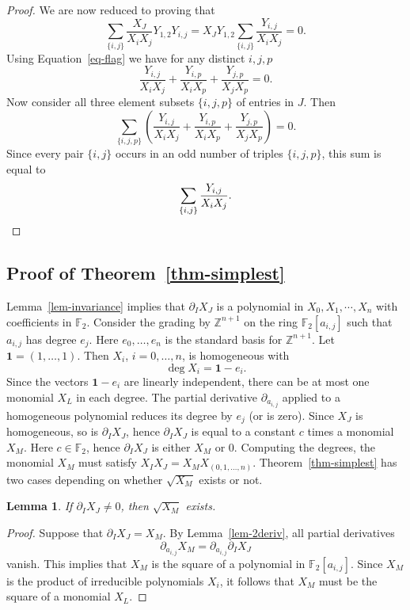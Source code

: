 \documentclass[10pt]{article}
\newtheorem{lemma}[theorem]{Lemma}
\theoremstyle{definition}
\newcommand{\FF}{{\mathbb{F}}}
\newcommand{\ZZ}{{\mathbb{Z}}}
\newcommand{\one}{{\mathbf{1}}}
\renewcommand{\a}[1]{a_{#1}}
\begin{document}
\begin{proof}
 We are now reduced to proving that 
 \[  \sum_{\{i,j\}} \frac{X_J}{X_{i}X_{j}} Y_{1,2} Y_{i,j} = X_J Y_{1,2} \sum_{\{i,j\}} \frac{Y_{i,j}}{X_{i}X_{j}}  = 0.\]
Using Equation~\eqref{eq-flag} we have for any distinct $i,j, p$
\[ \frac{Y_{i,j}}{X_{i}X_{j}} + \frac{Y_{i,p}}{X_{i}X_{p}} +\frac{Y_{j,p}}{X_{j}X_{p}} = 0.\]
Now consider all three element subsets $\{i,j,p\}$ of entries in $J$. Then 
\[ \sum_{\{i,j,p\}} \left( \frac{Y_{i,j}}{X_{i}X_{j}} + \frac{Y_{i,p}}{X_{i}X_{p}} +\frac{Y_{j,p}}{X_{j}X_{p}} \right) = 0.\]
Since every pair $\{i,j\}$ occurs in an odd number of triples $\{i,j,p\}$, this sum is equal to 
\[ \sum_{\{i,j\}} \frac{Y_{i,j}}{X_{i}X_{j}}. \qedhere\]
\end{proof}

\subsection{Proof of Theorem~\ref{thm-simplest}}

Lemma~\ref{lem-invariance} implies that $\partial_I X_J$ is a polynomial in $X_0, X_1, \cdots, X_n$ with coefficients in $\FF_2$.  Consider the grading by $\ZZ^{n+1}$ on the  ring $\FF_2[\a{i, j}]$ such that $\a{i, j}$ has degree $e_j$. Here $e_0,\ldots, e_{n}$ is the standard basis for $\ZZ^{n+1}$. Let $\one = (1,\ldots, 1)$. Then $X_i$, $i=0,\ldots, n$, is homogeneous with
\[ \deg X_i = \one - e_i.\]
Since the vectors $\one - e_i$ are linearly independent, there can be at most one monomial $X_L$ in each degree. 
The partial derivative $\partial_{\a{i,j}}$ applied to a homogeneous polynomial reduces its degree by $e_j$ (or is zero). Since $X_J$ is homogeneous, so is $\partial_I X_J$, hence $\partial_I X_J$ is equal to a constant $c$ times a monomial $X_M$. Here $c\in \FF_2$, hence $\partial_I X_J$ is either $X_M$ or $0$.
Computing the degrees, the monomial $X_M$ must satisfy $X_I X_J = X_M X_{(0,1,\dots,n)}$.
Theorem~\ref{thm-simplest} has two cases depending on whether $\sqrt{X_M}$ exists or not.

\begin{lemma} 
If $\partial_I X_J \neq 0$, then $\sqrt{X_M}$ exists.
\end{lemma}

\begin{proof}
Suppose that $\partial_I X_J = X_M$. By Lemma~\ref{lem-2deriv}, all partial derivatives  
 \[ \partial_{\a{i, j}} X_M = \partial_{\a{i, j}} \partial_I X_J\]
 vanish. This implies that $X_M$ is the square of a polynomial in $\FF_2[\a{i, j}]$. Since $X_M$ is the product of irreducible polynomials $X_i$, it follows that $X_M$ must be the square of a monomial $X_L$.
\end{proof}
\end{document}
